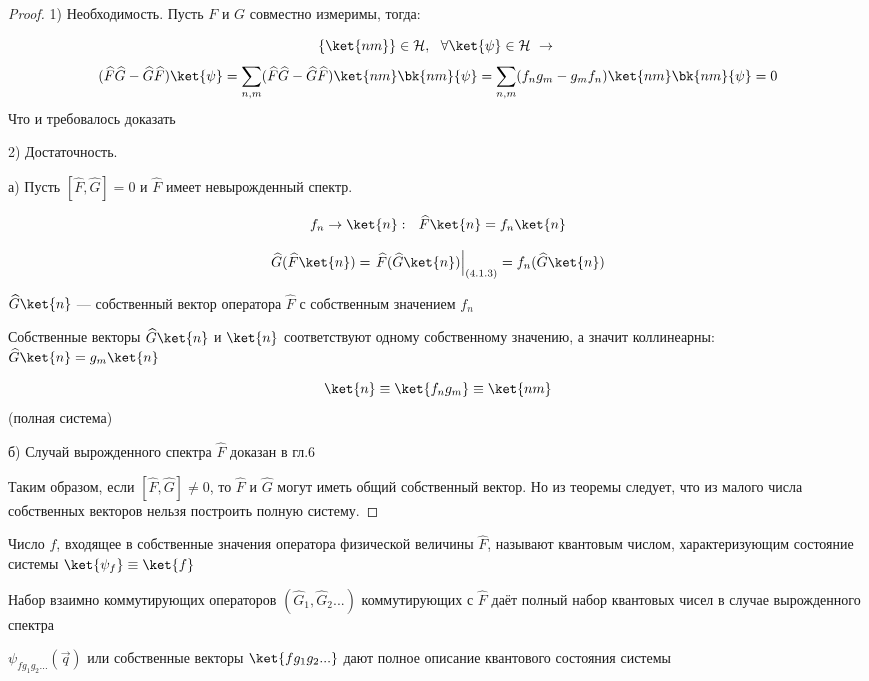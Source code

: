 \begin{proof}
1) Необходимость. Пусть $F$ и $G$ совместно измеримы, тогда:

$$ \{\ket{nm}\} \in \mathcal{H},~~ \forall \ket{\psi} \in \mathcal{H} ~\rightarrow ~$$
$$(\widehat{F}\widehat{G} - \widehat{G}\widehat{F}) \ket{\psi} = \sum_{n,m} (\widehat{F}\widehat{G} - \widehat{G}\widehat{F}) \ket{nm}\bk{nm}{\psi} = \sum_{n,m} (f_n g_m - g_m f_n) \ket{nm}\bk{nm}{\psi} = 0$$
Что и требовалось доказать

2) Достаточность. 

а) Пусть $[\widehat{F}, \widehat{G}] = 0$ и $\widehat{F}$ имеет невырожденный спектр.

\begin{equation}
\label{eq:4_1_3}
f_n \rightarrow \ket{n}:~~ \widehat{F} \ket{n} = f_n \ket{n}
\end{equation}

$$\widehat{G}(\widehat{F} \ket{n}) = \left. \widehat{F}(\widehat{G}\ket{n}) \right|_{(4.1.3)} = f_n (\widehat{G}\ket{n})$$

$\widehat{G} \ket{n}$ --- собственный вектор оператора $\widehat{F}$ с собственным значением $f_n$

Собственные векторы $\widehat{G} \ket{n}$ и $\ket{n}$ соответствуют одному собственному значению, а значит коллинеарны: $\widehat{G} \ket{n} = g_m \ket{n}$

$$\ket{n} \equiv \ket{f_n g_m} \equiv \ket{nm}$$ (полная система)

б) Случай вырожденного спектра $\widehat{F}$ доказан в гл.6

Таким образом, если $[\widehat{F},\widehat{G}]\ne0$, то $\widehat{F}$ и $\widehat{G}$ могут иметь общий собственный вектор. Но из теоремы следует, что из малого числа собственных векторов нельзя построить полную систему.
\end{proof}

\begin{defn}
Число $f$, входящее в собственные значения оператора физической величины $\widehat{F}$, называют квантовым числом, характеризующим состояние системы $\ket{\psi_f}\equiv\ket{f}$
\end{defn}

Набор взаимно коммутирующих операторов $(\widehat{G}_1, \widehat{G}_2...)$ коммутирующих с $\widehat{F}$ даёт полный набор квантовых чисел в случае вырожденного спектра 

$\psi_{f g_1 g_2 ...}(\vec{q})$ или собственные векторы $\ket{f g_1 g_2 ...}$ дают полное описание квантового состояния системы

